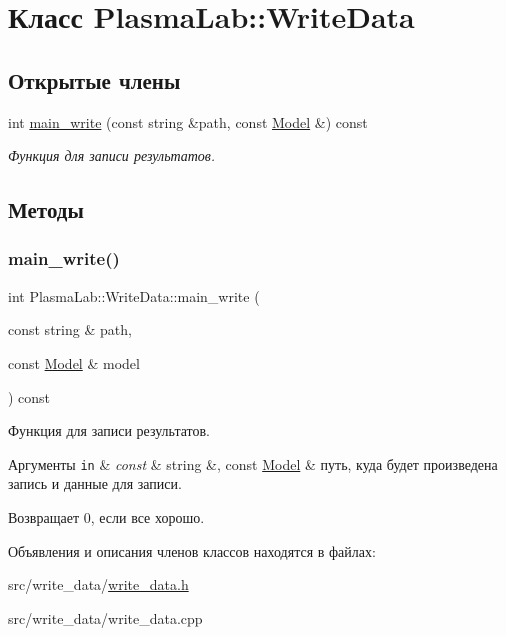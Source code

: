 \hypertarget{class_plasma_lab_1_1_write_data}{}\section{Класс Plasma\+Lab\+:\+:Write\+Data}
\label{class_plasma_lab_1_1_write_data}
\subsection*{Открытые члены}
\begin{DoxyCompactItemize}
\item 
int \hyperlink{class_plasma_lab_1_1_write_data_a0908f4e8c390566ee9ecf9669aceaa7d}{main\+\_\+write} (const string \&path, const \hyperlink{class_plasma_lab_1_1_model}{Model} \&) const
\begin{DoxyCompactList}\small\item\em Функция для записи результатов. \end{DoxyCompactList}\end{DoxyCompactItemize}


\subsection{Методы}
\mbox{\label{class_plasma_lab_1_1_write_data_a0908f4e8c390566ee9ecf9669aceaa7d}} 
\subsubsection{\texorpdfstring{main\+\_\+write()}{main\_write()}}
{\footnotesize\ttfamily int Plasma\+Lab\+::\+Write\+Data\+::main\+\_\+write (\begin{DoxyParamCaption}\item[{const string \&}]{path,  }\item[{const \hyperlink{class_plasma_lab_1_1_model}{Model} \&}]{model }\end{DoxyParamCaption}) const}



Функция для записи результатов. 


\begin{DoxyParams}[1]{Аргументы}
\mbox{\tt in}  & {\em const} & string \&, const \hyperlink{class_plasma_lab_1_1_model}{Model} \& путь, куда будет произведена запись и данные для записи. \\
\hline
\end{DoxyParams}
\begin{DoxyReturn}{Возвращает}
0, если все хорошо. 
\end{DoxyReturn}


Объявления и описания членов классов находятся в файлах\+:\begin{DoxyCompactItemize}
\item 
src/write\+\_\+data/\hyperlink{write__data_8h}{write\+\_\+data.\+h}\item 
src/write\+\_\+data/write\+\_\+data.\+cpp\end{DoxyCompactItemize}
